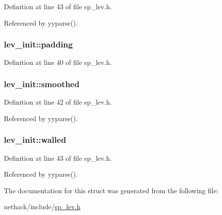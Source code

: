 Definition at line 43 of file sp\+\_\+lev.\+h.



Referenced by yyparse().

\hypertarget{structlev__init_aee1cc1239553cf34115e6bfb90475075}{
\subsubsection[{padding}]{ lev\+\_\+init\+::padding}}\label{structlev__init_aee1cc1239553cf34115e6bfb90475075}


Definition at line 40 of file sp\+\_\+lev.\+h.

\hypertarget{structlev__init_acc2766b536116ec0723576ca282449dd}{
\subsubsection[{smoothed}]{ lev\+\_\+init\+::smoothed}}\label{structlev__init_acc2766b536116ec0723576ca282449dd}


Definition at line 42 of file sp\+\_\+lev.\+h.



Referenced by yyparse().

\hypertarget{structlev__init_a97254371d5b19966ba23b3a65a085ef8}{
\subsubsection[{walled}]{ lev\+\_\+init\+::walled}}\label{structlev__init_a97254371d5b19966ba23b3a65a085ef8}


Definition at line 43 of file sp\+\_\+lev.\+h.



Referenced by yyparse().



The documentation for this struct was generated from the following file\+:\begin{DoxyCompactItemize}
\item 
nethack/include/\hyperlink{sp__lev_8h}{sp\+\_\+lev.\+h}\end{DoxyCompactItemize}
